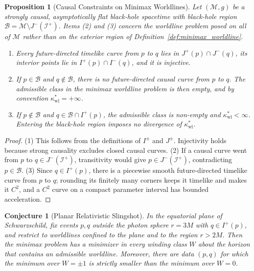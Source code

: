 \documentclass[11pt,reqno]{amsart}
\newtheorem{proposition}[theorem]{Proposition}
\newtheorem{conjecture}[theorem]{Conjecture}
\theoremstyle{definition}
\numberwithin{equation}{section}
\begin{document}
\begin{proposition}[Causal Constraints on Minimax Worldlines]
\label{prop:causal_constraints}
Let $(\mathcal{M}, g)$ be a strongly causal, asymptotically flat black-hole spacetime with black-hole region $\mathcal{B} = \mathcal{M} \setminus J^-(\mathscr{I}^+)$. Items (2) and (3) concern the worldline problem posed on all of $\mathcal{M}$ rather than on the exterior region of Definition~\ref{def:minimax_worldline}.
\begin{enumerate}
    \item Every future-directed timelike curve from $p$ to $q$ lies in $J^+(p) \cap J^-(q)$, its interior points lie in $I^+(p) \cap I^-(q)$, and it is injective.
    \item If $p \in \mathcal{B}$ and $q \notin \mathcal{B}$, there is no future-directed causal curve from $p$ to $q$. The admissible class in the minimax worldline problem is then empty, and by convention $\kappa^*_{\mathrm{wl}} = +\infty$.
    \item If $p \notin \mathcal{B}$ and $q \in \mathcal{B} \cap I^+(p)$, the admissible class is non-empty and $\kappa^*_{\mathrm{wl}} < \infty$. Entering the black-hole region imposes no divergence of $\kappa^*_{\mathrm{wl}}$.
\end{enumerate}
\end{proposition}
\begin{proof}
(1) This follows from the definitions of $I^\pm$ and $J^\pm$. Injectivity holds because strong causality excludes closed causal curves. (2) If a causal curve went from $p$ to $q \in J^-(\mathscr{I}^+)$, transitivity would give $p \in J^-(\mathscr{I}^+)$, contradicting $p \in \mathcal{B}$. (3) Since $q \in I^+(p)$, there is a piecewise smooth future-directed timelike curve from $p$ to $q$; rounding its finitely many corners keeps it timelike and makes it $C^2$, and a $C^2$ curve on a compact parameter interval has bounded acceleration.
\end{proof}

\begin{conjecture}[Planar Relativistic Slingshot]
\label{conj:slingshot}
In the equatorial plane of Schwarzschild, fix events $p, q$ outside the photon sphere $r = 3M$ with $q \in I^+(p)$, and restrict to worldlines confined to the plane and to the region $r > 2M$. Then the minimax problem has a minimizer in every winding class $W$ about the horizon that contains an admissible worldline. Moreover, there are data $(p,q)$ for which the minimum over $W = \pm 1$ is strictly smaller than the minimum over $W = 0$.
\end{conjecture}
\end{document}
